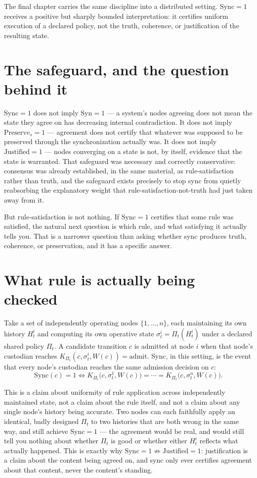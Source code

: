 \documentclass[11pt,openany]{book}
\begin{document}
The final chapter carries the same discipline into a distributed setting. $\mathrm{Sync}=1$ receives a positive but sharply bounded interpretation: it certifies uniform execution of a declared policy, not the truth, coherence, or justification of the resulting state.

\section{The safeguard, and the question behind it}

$\mathrm{Sync}=1$ does not imply $\mathrm{Syn}=1$ — a system's nodes agreeing does not mean the state they agree on has decreasing internal contradiction. It does not imply $\mathrm{Preserve}_s=1$ — agreement does not certify that whatever was supposed to be preserved through the synchronization actually was. It does not imply $\mathrm{Justified}=1$ — nodes converging on a state is not, by itself, evidence that the state is warranted. That safeguard was necessary and correctly conservative: consensus was already established, in the same material, as rule-satisfaction rather than truth, and the safeguard exists precisely to stop sync from quietly reabsorbing the explanatory weight that rule-satisfaction-not-truth had just taken away from it.

But rule-satisfaction is not nothing. If $\mathrm{Sync}=1$ certifies that some rule was satisfied, the natural next question is which rule, and what satisfying it actually tells you. That is a narrower question than asking whether sync produces truth, coherence, or preservation, and it has a specific answer.

\section{What rule is actually being checked}

Take a set of independently operating nodes $\{1, \dots, n\}$, each maintaining its own history $H_t^i$ and computing its own operative state $\sigma_t^i = \Pi_t(H_t^i)$ under a declared shared policy $\Pi_t$. A candidate transition $c$ is admitted at node $i$ when that node's custodian reaches $K_{\Pi_t}(c, \sigma_t^i, W(c)) = \mathrm{admit}$. Sync, in this setting, is the event that every node's custodian reaches the same admission decision on $c$:
\[
\mathrm{Sync}(c) = 1 \iff K_{\Pi_t}\big(c, \sigma_t^1, W(c)\big) = \cdots = K_{\Pi_t}\big(c, \sigma_t^n, W(c)\big).
\]

This is a claim about uniformity of rule application across independently maintained state, not a claim about the rule itself, and not a claim about any single node's history being accurate. Two nodes can each faithfully apply an identical, badly designed $\Pi_t$ to two histories that are both wrong in the same way, and still achieve $\mathrm{Sync}=1$ — the agreement would be real, and would still tell you nothing about whether $\Pi_t$ is good or whether either $H_t^i$ reflects what actually happened. This is exactly why $\mathrm{Sync}=1 \not\Rightarrow \mathrm{Justified}=1$: justification is a claim about the content being agreed on, and sync only ever certifies agreement about that content, never the content's standing.
\end{document}
